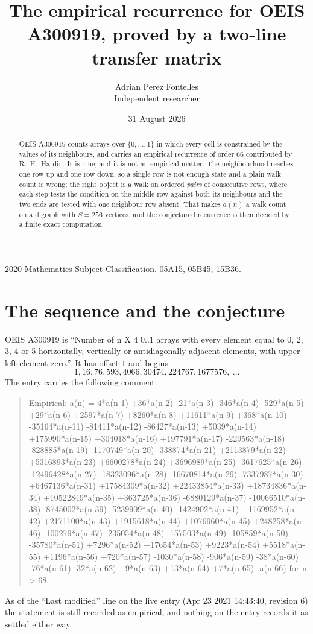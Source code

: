 \documentclass[11pt,a4paper]{article}
\title{The empirical recurrence for OEIS A300919, proved by a two-line transfer matrix}
\author{Adrian Perez Fontelles\\ \small Independent researcher}
\date{31 August 2026}
\theoremstyle{plain}
\theoremstyle{definition}
\begin{document}
\maketitle

\begin{abstract}
OEIS A300919 counts arrays over $\{0,\dots,1\}$ in which every cell is constrained by the
values of its neighbours, and carries an empirical recurrence of order $66$ contributed
by R.~H.~Hardin. It is true, and it is not an empirical matter. The neighbourhood reaches one
row up and one row down, so a single row is not enough state and a plain walk count
is wrong; the right object is a walk on ordered \emph{pairs} of consecutive rows, where
each step tests the condition on the middle row against both its neighbours and the two
ends are tested with one neighbour row absent. That makes $a(n)$ a walk count on a digraph
with $S=256$ vertices, and the conjectured recurrence is then decided by a finite exact
computation.
\end{abstract}

\noindent\small 2020 Mathematics Subject Classification. 05A15, 05B45, 15B36.\normalsize

\section{The sequence and the conjecture}

OEIS A300919 is ``Number of n X 4 0..1 arrays with every element equal to 0, 2, 3, 4 or 5 horizontally, vertically or antidiagonally adjacent elements, with upper left element zero.''. It has offset $1$ and begins
\[
1, 16, 76, 593, 4066, 30474, 224767, 1677576,\ \dots
\]
The entry carries the following comment:
\begin{quote}\small
Empirical: a(n) = 4*a(n-1) +36*a(n-2) -21*a(n-3) -346*a(n-4) -529*a(n-5) +29*a(n-6) +2597*a(n-7) +8260*a(n-8) +11611*a(n-9) +368*a(n-10) -35164*a(n-11) -81411*a(n-12) -86427*a(n-13) +5039*a(n-14) +175990*a(n-15) +304018*a(n-16) +197791*a(n-17) -229563*a(n-18) -828885*a(n-19) -1170749*a(n-20) -338874*a(n-21) +2113879*a(n-22) +5316893*a(n-23) +6600278*a(n-24) +3696989*a(n-25) -3617625*a(n-26) -12496428*a(n-27) -18323096*a(n-28) -16670814*a(n-29) -7337987*a(n-30) +6467136*a(n-31) +17584309*a(n-32) +22433854*a(n-33) +18734836*a(n-34) +10522849*a(n-35) +363725*a(n-36) -6880129*a(n-37) -10066510*a(n-38) -8745002*a(n-39) -5239909*a(n-40) -1424902*a(n-41) +1169952*a(n-42) +2171100*a(n-43) +1915618*a(n-44) +1076960*a(n-45) +248258*a(n-46) -100279*a(n-47) -235054*a(n-48) -157503*a(n-49) -105859*a(n-50) -35780*a(n-51) +7296*a(n-52) +17654*a(n-53) +9223*a(n-54) +5518*a(n-55) +1196*a(n-56) +720*a(n-57) -1030*a(n-58) -906*a(n-59) -38*a(n-60) -76*a(n-61) -32*a(n-62) +9*a(n-63) +13*a(n-64) +7*a(n-65) -a(n-66) for n > 68.
\end{quote}
As of the ``Last modified'' line on the live entry (Apr 23 2021 14:43:40, revision 6) the statement is
still recorded as empirical, and nothing on the entry records it as settled either way.
\end{document}
